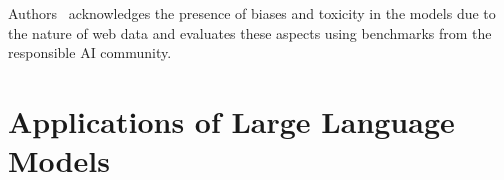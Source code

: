 Authors~\cite{touvron2023llama} acknowledges the presence of biases and toxicity in the models due to the nature of web data and evaluates these aspects using benchmarks from the responsible AI community.


\section{Applications of Large Language Models}
\label{sec:applications-of-large-language-models}
